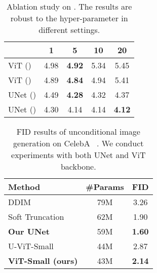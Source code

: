 \begin{table}[t]
\begin{center}
\setlength{\tabcolsep}{2mm}
\begin{tabular}{l c c c c }
\toprule
 & 1 & 5 & 10 & 20  \\
\midrule
ViT () & 4.98 & \textbf{4.92} & 5.34 & 5.45  \\
ViT ()  & 4.89 & \textbf{4.84} & 4.94 & 5.41  \\
UNet () & 4.49 & \textbf{4.28} & 4.32 & 4.37  \\
UNet () & 4.30 & 4.14 & 4.14 & \textbf{4.12}  \\
\bottomrule
\end{tabular}
\end{center}
\vspace{-5mm}
\caption{ 
Ablation study on .
The results are robust to the hyper-parameter  in different settings.}
\label{tab:abl-diff-k}
\vspace{-3mm}
\end{table}


\begin{table}[t]
\begin{center}
\begin{tabular}{l c c}
\toprule
Method & \#Params & FID \\
\midrule
DDIM~\cite{ddim} & 79M & 3.26 \\
Soft Truncation~\cite{ddim} & 62M & 1.90 \\
\textbf{Our UNet} & 59M & \textbf{1.60} \\
\midrule
U-ViT-Small~\cite{bao2022uvit} & 44M &   2.87 \\
\textbf{ViT-Small (ours)} & 43M &   \textbf{2.14} \\
\bottomrule
\end{tabular}
\end{center}
\vspace{-5mm}
\caption{FID results of unconditional image generation on CelebA ~\cite{liu2015CelebA}. 
We conduct experiments with both UNet and ViT backbone.
}
\label{tab:CelebA64}
\vspace{-3mm}
\end{table}











